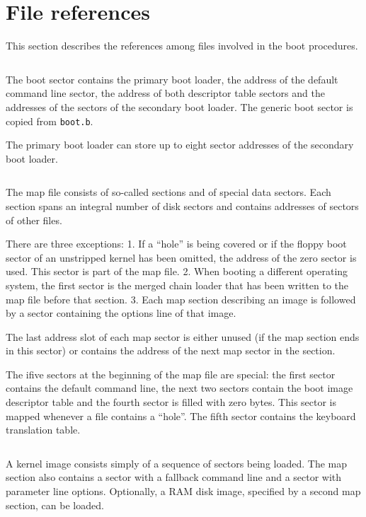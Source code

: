 \section{File references}

This section describes the references among files involved in the boot
procedures.

$$
  
$$

The boot sector contains the primary boot loader, the address of the default
command line sector, the address of both
descriptor table sectors and the addresses of the sectors of the secondary
boot loader. The generic boot sector is copied from {\tt boot.b}.

The primary boot loader can store up to eight sector addresses of the
secondary boot loader.

$$
  
$$

The map file consists of so-called sections and of special data sectors.
Each section
spans an integral number of disk sectors and contains addresses of sectors
of other files.

There are three exceptions: 1. If a ``hole'' is being
covered or if the floppy boot sector of an unstripped kernel has been omitted,
the address of the zero sector is used. This sector is part of the
map file. 2. When booting a different operating system, the first sector is
the merged chain loader that has been written to the map file before that
section. 3. Each map section describing an image is followed by a sector
containing the options line of that image.

The last address slot of each map sector is either unused (if the map section
ends in this sector) or contains the address of the next map sector in the
section.

The ifive sectors at the beginning of the map file are special: the first
sector contains the default command line, the next
two sectors contain the boot image descriptor table and the fourth sector
is filled with zero bytes. This sector is mapped whenever a file contains
a ``hole''. The fifth sector contains the keyboard translation table.

$$
  
$$

A kernel image consists simply of a sequence of sectors being
loaded. The map section also contains a sector with a fallback command line
and a sector with parameter line options. Optionally, a RAM disk image,
specified by a second map section, can be loaded.

$$
  
$$

